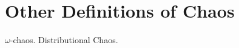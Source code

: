 \documentclass[12pt,twoside,draft]{book}
\begin{document}
\chapter{Other Definitions of Chaos}
$\omega$-chaos\citep{omegachaos}.
Distributional Chaos\citep{dchaos1}\citep{dchaos2}.




\printindex
\end{document}
